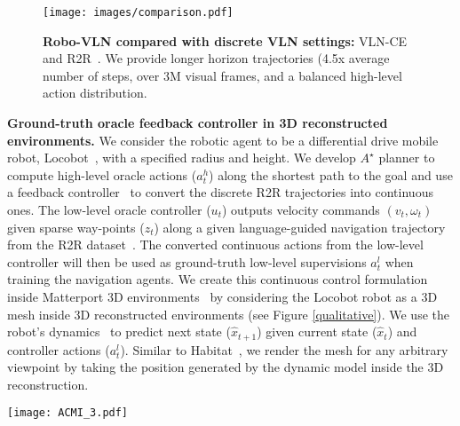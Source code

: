 \documentclass[letter, 10pt, conference]{ieeeconf}
\begin{document}
\begin{figure}[t!]
\centering
\texttt{[image: images/comparison.pdf]}
\centering
  \caption{
  \textbf{Robo-VLN compared with discrete VLN settings:} VLN-CE~\cite{krantz2020navgraph} and R2R~\cite{mattersim}.
  We provide longer horizon trajectories (4.5x average number of steps, over 3M visual frames, and a balanced high-level action distribution.
  }
  \label{comparison_discrete}
\end{figure}

\textbf{Ground-truth oracle feedback controller in 3D reconstructed environments.}
We consider the robotic agent to be a differential drive mobile robot, Locobot~\cite{pyrobot2019}, with a specified radius and height. We develop $A^{\star}$ planner to compute high-level oracle actions ($a^{h}_{t}$) along the shortest path to the goal and use a feedback controller~\cite{9780133496598} to convert the discrete R2R trajectories \cite{mattersim} into continuous ones.
The low-level oracle controller ($u_{t}$) outputs velocity commands $(v_{t}, \omega_{t})$ given sparse way-points ($z_{t}$) along a given language-guided navigation trajectory from the R2R dataset~\cite{Matterport3D}.
The converted continuous actions from the low-level controller will then be used as ground-truth low-level supervisions $a^{l}_{t}$ when training the navigation agents.
We create this continuous control formulation inside Matterport 3D environments~\cite{Matterport3D} by considering the Locobot robot as a 3D mesh inside 3D reconstructed environments (see Figure \ref{qualitative}).
We use the robot's dynamics~\cite{10.5555/1855026} to predict next state ($\hat{x}_{t+1}$) given current state ($\hat{x}_{t}$) and controller actions ($a^{l}_{t}$). 
Similar to Habitat~\cite{habitat19iccv}, we render the mesh for any arbitrary viewpoint by taking the position generated by the dynamic model inside the 3D reconstruction.

\begin{comment}
\begin{figure}[t!]
\centering
\texttt{[image: navigable.pdf]}
\label{navigable}
\caption{Exploration of environment using optimal control supervisions}
\end{figure}
\end{comment}

\begin{figure*}[t!]
\centering
\texttt{[image: ACMI\_3.pdf]}
\label{framework}
\end{figure*}
\end{document}
